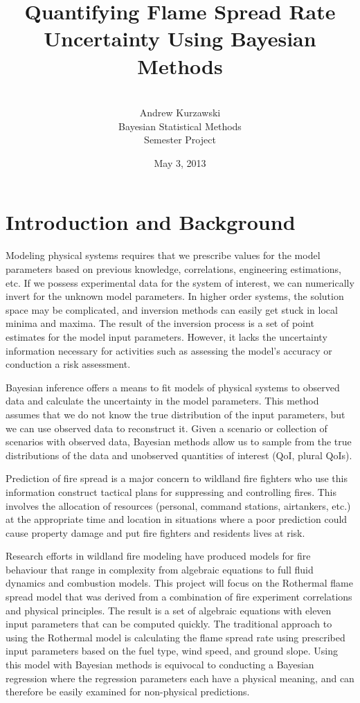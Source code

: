 \documentclass[11pt]{article}
\title{Quantifying Flame Spread Rate Uncertainty Using Bayesian Methods}
\author{
        \\
        Andrew Kurzawski \\
        Bayesian Statistical Methods \\ 
        Semester Project \\
}
\date{May 3, 2013}
\begin{document}
\maketitle

\clearpage

\pagestyle{plain}


\section{Introduction and Background}

Modeling physical systems requires that we prescribe values for the model parameters based on previous knowledge, correlations, engineering estimations, etc. If we possess experimental data for the system of interest, we can numerically invert for the unknown model parameters. In higher order systems, the solution space may be complicated, and inversion methods can easily get stuck in local minima and maxima. The result of the inversion process is a set of point estimates for the model input parameters. However, it lacks the uncertainty information necessary for activities such as assessing the model's accuracy or conduction a risk assessment.

Bayesian inference offers a means to fit models of physical systems to observed data and calculate the uncertainty in the model parameters. This method assumes that we do not know the true distribution of the input parameters, but we can use observed data to reconstruct it. Given a scenario or collection of scenarios with observed data, Bayesian methods allow us to sample from the true distributions of the data and unobserved quantities of interest (QoI, plural QoIs).

Prediction of fire spread is a major concern to wildland fire fighters who use this information construct tactical plans for suppressing and controlling fires. This involves the allocation of resources (personal, command stations, airtankers, etc.) at the appropriate time and location in situations where a poor prediction could cause property damage and put fire fighters and residents lives at risk.

Research efforts in wildland fire modeling have produced models for fire behaviour that range in complexity from algebraic equations to full fluid dynamics and combustion models. This project will focus on the Rothermal flame spread model \cite{rothermel1972mathematical} that was derived from a combination of fire experiment correlations and physical principles. The result is a set of algebraic equations with eleven input parameters that can be computed quickly. The traditional approach to using the Rothermal model is calculating the flame spread rate using prescribed input parameters based on the fuel type, wind speed, and ground slope. Using this model with Bayesian methods is equivocal to conducting a Bayesian regression where the regression parameters each have a physical meaning, and can therefore be easily examined for non-physical predictions.
\end{document}

